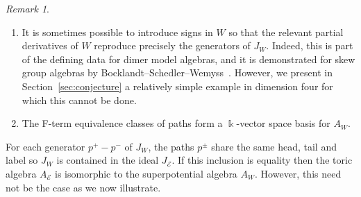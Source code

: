 \documentclass[11pt,a4paper]{amsart}
\numberwithin{equation}{section}
\theoremstyle{definition}
\theoremstyle{remark}
\newtheorem{remark}[theorem]{Remark}
\newcommand{\kk}{\ensuremath{\Bbbk}}
\begin{document}
\begin{remark}
\begin{enumerate}
\item It is sometimes possible to introduce signs in $W$ so that the relevant partial derivatives of $W$ reproduce precisely the generators of $J_W$.  Indeed, this is part of the defining data for dimer model algebras, and it is demonstrated for skew group algebras by Bocklandt--Schedler--Wemyss~\cite{BSW}. However,  we present in Section~\ref{sec:conjecture} a relatively simple example in dimension four for which this cannot be done. 
\item The F-term equivalence classes of paths form a $\kk$-vector space basis for $A_W$.
\end{enumerate}
\end{remark}



For each generator $p^+-p^-$ of $J_W$,  the paths $p^\pm$ share the same head, tail and label so $J_W$ is contained in the ideal $J_{\mathscr{E}}$. If this inclusion is equality then the toric algebra $A_{\mathscr{E}}$ is isomorphic to the superpotential algebra $A_W$. However,  this need not be the case as we now illustrate.
\end{document}
